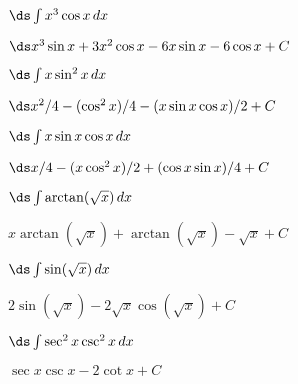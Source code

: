 \begin{enumialphparenastyle}
\begin{ex}
 $\ds\int x^3\cos x\,dx$
\begin{sol}
 $\ds x^3\sin x+3x^2\cos x-6x\sin x-6\cos x+C$
\end{sol}
\end{ex}

\begin{ex}
 $\ds\int x\sin^2 x\,dx$
\begin{sol}
 $\ds x^2/4-(\cos^2 x)/4-(x\sin x\cos x)/2+C$
\end{sol}
\end{ex}

\begin{ex}
 $\ds\int x\sin x\cos x\,dx$
\begin{sol}
 $\ds x/4-(x\cos^2 x)/2+(\cos x\sin x)/4+C$
\end{sol}
\end{ex}

\begin{ex}
 $\ds\int \arctan(\sqrt x)\,dx$
\begin{sol}
 $x\arctan(\sqrt x)+\arctan(\sqrt x)-\sqrt{x}+C$
\end{sol}
\end{ex}

\begin{ex}
 $\ds\int \sin(\sqrt x)\,dx$
\begin{sol}
 $2\sin(\sqrt x)-2\sqrt x\cos(\sqrt x)+C$
\end{sol}
\end{ex}

\begin{ex}
 $\ds\int\sec^2 x\csc^2 x\,dx$
\begin{sol}
 $\sec x\csc x-2\cot x+C$
\end{sol}
\end{ex}

\end{enumialphparenastyle}
